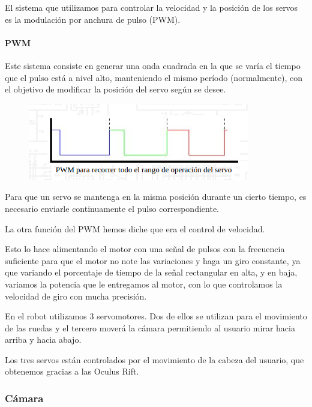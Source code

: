 \documentclass[twoside, 12pt]{epstfg}
\begin{document}
El sistema que utilizamos para controlar la velocidad y la posición de los servos es la modulación por anchura de pulso (PWM).

\paragraph{PWM}

Este sistema consiste en generar una onda cuadrada en la que se varía el tiempo que el pulso está a nivel alto, manteniendo el mismo período (normalmente), con el objetivo de modificar la posición del servo según se desee.

\begin{figure}[h]
	\centerline{
		\mbox{\includegraphics[width=.80\textwidth]{images/ondaServo.png}}
	}
	
\end{figure}



Para que un servo se mantenga en la misma posición durante un cierto tiempo, es necesario enviarle continuamente el pulso correspondiente.


La otra función del PWM hemos diche que era el control de velocidad.

Esto lo hace alimentando el motor con una señal de pulsos con la frecuencia suficiente para que el motor no note las variaciones y haga un giro constante, ya que variando el porcentaje de tiempo de la señal rectangular en alta, y en baja, variamos la potencia que le entregamos al motor, con lo que controlamos la velocidad de giro con mucha precisión.

En el robot utilizamos 3 servomotores.
Dos de ellos se utilizan para el movimiento de las ruedas y el tercero moverá la cámara permitiendo al usuario mirar hacia arriba y hacia abajo.

Los tres servos están controlados por el movimiento de la cabeza del usuario, que obtenemos gracias a las Oculus Rift.

\subsubsection{Cámara}
\end{document}
